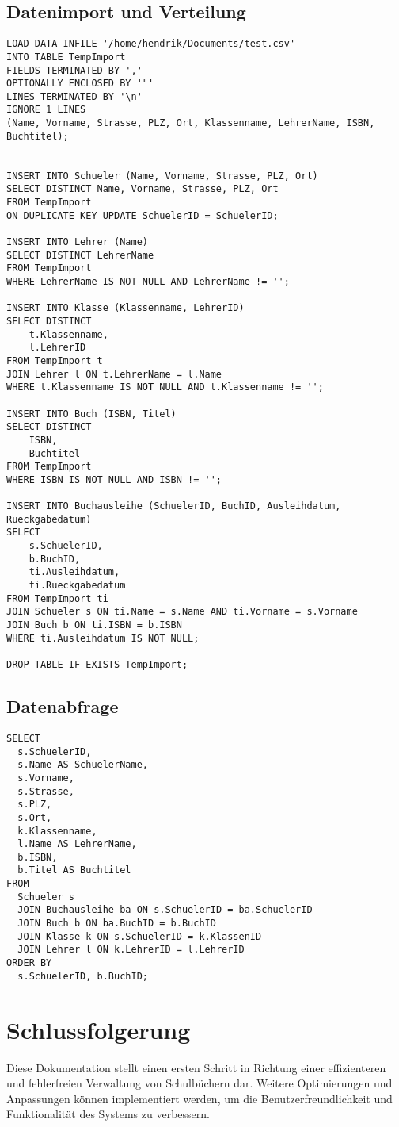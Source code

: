 \documentclass[12pt,a4paper]{article}
\begin{document}
\subsection{Datenimport und Verteilung}
\begin{lstlisting}
LOAD DATA INFILE '/home/hendrik/Documents/test.csv'
INTO TABLE TempImport
FIELDS TERMINATED BY ','
OPTIONALLY ENCLOSED BY '"'
LINES TERMINATED BY '\n'
IGNORE 1 LINES
(Name, Vorname, Strasse, PLZ, Ort, Klassenname, LehrerName, ISBN, Buchtitel);


INSERT INTO Schueler (Name, Vorname, Strasse, PLZ, Ort)
SELECT DISTINCT Name, Vorname, Strasse, PLZ, Ort 
FROM TempImport
ON DUPLICATE KEY UPDATE SchuelerID = SchuelerID;

INSERT INTO Lehrer (Name)
SELECT DISTINCT LehrerName
FROM TempImport
WHERE LehrerName IS NOT NULL AND LehrerName != '';

INSERT INTO Klasse (Klassenname, LehrerID)
SELECT DISTINCT 
    t.Klassenname, 
    l.LehrerID
FROM TempImport t
JOIN Lehrer l ON t.LehrerName = l.Name
WHERE t.Klassenname IS NOT NULL AND t.Klassenname != '';

INSERT INTO Buch (ISBN, Titel)
SELECT DISTINCT 
    ISBN, 
    Buchtitel
FROM TempImport
WHERE ISBN IS NOT NULL AND ISBN != '';

INSERT INTO Buchausleihe (SchuelerID, BuchID, Ausleihdatum, Rueckgabedatum)
SELECT 
    s.SchuelerID, 
    b.BuchID, 
    ti.Ausleihdatum, 
    ti.Rueckgabedatum
FROM TempImport ti
JOIN Schueler s ON ti.Name = s.Name AND ti.Vorname = s.Vorname
JOIN Buch b ON ti.ISBN = b.ISBN
WHERE ti.Ausleihdatum IS NOT NULL;

DROP TABLE IF EXISTS TempImport;
\end{lstlisting}

\newpage
\subsection{Datenabfrage}
\begin{lstlisting}
SELECT
  s.SchuelerID,
  s.Name AS SchuelerName,
  s.Vorname,
  s.Strasse,
  s.PLZ,
  s.Ort,
  k.Klassenname,
  l.Name AS LehrerName,
  b.ISBN,
  b.Titel AS Buchtitel
FROM
  Schueler s
  JOIN Buchausleihe ba ON s.SchuelerID = ba.SchuelerID
  JOIN Buch b ON ba.BuchID = b.BuchID
  JOIN Klasse k ON s.SchuelerID = k.KlassenID
  JOIN Lehrer l ON k.LehrerID = l.LehrerID
ORDER BY
  s.SchuelerID, b.BuchID;
\end{lstlisting}

\newpage
\section{Schlussfolgerung}
Diese Dokumentation stellt einen ersten Schritt in Richtung einer effizienteren und fehlerfreien Verwaltung von Schulbüchern dar. Weitere Optimierungen und Anpassungen können implementiert werden, um die Benutzerfreundlichkeit und Funktionalität des Systems zu verbessern.
\end{document}
